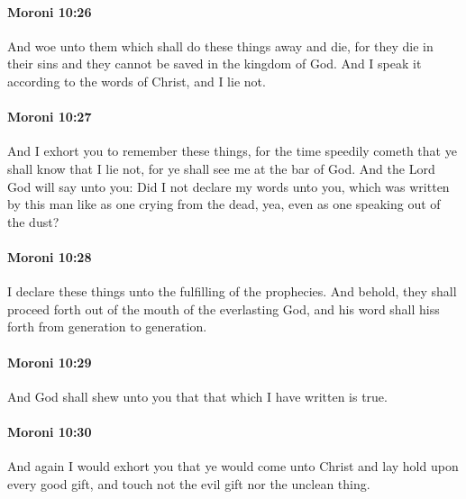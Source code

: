 		\paragraph{Moroni 10:26} %
			\label{MORONI-10-26}

			And woe unto them which shall do these things away and die,
			for they die in their sins
			and they cannot be saved in the kingdom of God.
			And I speak it according to the words of Christ, and I lie not.

		\paragraph{Moroni 10:27} %
			\label{MORONI-10-27}

			And I exhort you to remember these things,
			for the time speedily cometh that ye shall know that I lie not,
			for ye shall see me at the bar of God.
			And the Lord God will say unto you:
			Did I not declare my words unto you,
			which was written by this man like as one crying from the dead,
			yea, even as one speaking out of the dust?

		\paragraph{Moroni 10:28} %
			\label{MORONI-10-28}

			I declare these things unto the fulfilling of the prophecies.
			And behold, they shall proceed forth out of the mouth of the everlasting God,
			and his word shall hiss forth from generation to generation.

		\paragraph{Moroni 10:29} %
			\label{MORONI-10-29}

			And God shall shew unto you
			that that which I have written is true.

		\paragraph{Moroni 10:30} %
			\label{MORONI-10-30}

			And again I would exhort you
			that ye would come unto Christ
			and lay hold upon every good gift,
			and touch not the evil gift nor the unclean thing.

